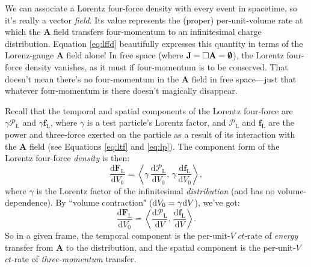 \documentclass[12pt]{article}
\renewcommand{\vv}[1]{\mathbf{#1}}
\newcommand{\dd}[1]{\mathrm{d}#1}
\begin{document}
We can associate a Lorentz four-force density with every event in spacetime, so it's really a vector \emph{field}. Its value represents the (proper) per-unit-volume rate at which the $\vv A$ field transfers four-momentum to an infinitesimal charge distribution. Equation \ref{eq:lffd} beautifully expresses this quantity in terms of the Lorenz-gauge $\vv A$ field alone! In free space (where $\vv J = \Box \vv A = \textrm{\mbox{\boldmath $\emptyset$}}$), the Lorentz four-force density vanishes, as it must if four-momentum is to be conserved. That doesn't mean there's no four-momentum in the $\vv A$ field in free space---just that whatever four-momentum is there doesn't magically disappear.

Recall that the temporal and spatial components of the Lorentz four-force are $\gamma \mathcal{P}_{\mathrm{L}}$ and $\gamma \vv f_{\textrm{L}}$, where $\gamma$ is a test particle's Lorentz factor, and $\mathcal{P}_{\mathrm{L}}$ and $\vv f_{\textrm{L}}$ are the power and three-force exerted on the particle as a result of its interaction with the $\vv A$ field (see Equations  \ref{eq:ltf} and \ref{eq:lp}). The component form of the Lorentz four-force \emph{density} is then:
\begin{equation*}
\dfrac{\dd \vv F_{\mathrm{L}}}{\dd V_0} = \left \langle \gamma \, \dfrac{\dd \mathcal{P}_{\textrm{L}} }{\dd V_0}, \, \gamma \, \dfrac{\dd \vv f_{\textrm{L}}}{\dd V_0} \right \rangle,
\end{equation*}
where $\gamma$ is the Lorentz factor of the infinitesimal \emph{distribution} (and has no volume-dependence). By ``volume contraction" ($\dd V_0 = \gamma \mkern1mu \dd V$), we've got:
\begin{equation}\label{eq:lffdc}
\dfrac{\dd \vv F_{\mathrm{L}}}{\dd V_0} = \left \langle \dfrac{\dd \mathcal{P}_{\mathrm{L}}}{\dd V}, \, \dfrac{\dd \vv f_{\mathrm{L}}}{\dd V} \right \rangle .
\end{equation}
So in a given frame, the temporal component is the per-unit-$V$ $ct$-rate of \emph{energy} transfer from $\vv A$ to the distribution, and the spatial component is the per-unit-$V$ $ct$-rate of \emph{three-momentum} transfer.
\end{document}
